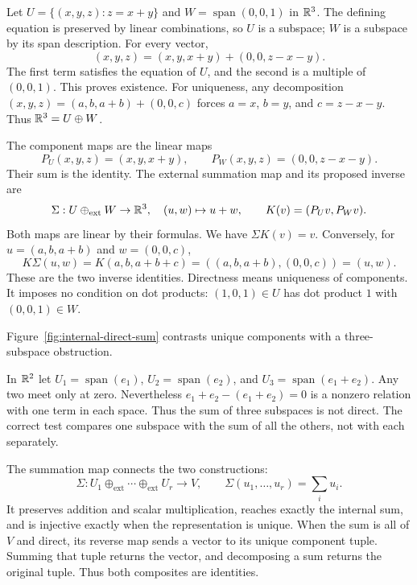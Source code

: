 \begin{example}\label{ex:positive-direct-sum}
Let $U=\{(x,y,z):z=x+y\}$ and $W=\operatorname{span}(0,0,1)$ in $\mathbb{R}^3$.
The defining equation is preserved by linear combinations, so $U$ is a
subspace; $W$ is a subspace by its span description. For every vector,
\[
(x,y,z)=(x,y,x+y)+(0,0,z-x-y).
\]
The first term satisfies the equation of $U$, and the second is a multiple
of $(0,0,1)$. This proves existence. For uniqueness, any decomposition
$(x,y,z)=(a,b,a+b)+(0,0,c)$ forces $a=x$, $b=y$, and $c=z-x-y$.
Thus $\mathbb{R}^3=U\oplus W$.

The component maps are the linear maps
\[
P_U(x,y,z)=(x,y,x+y),\qquad P_W(x,y,z)=(0,0,z-x-y).
\]
Their sum is the identity. The external summation map and its proposed inverse are
\[
\Sigma:U\oplus_{\mathrm{ext}}W\to\mathbb{R}^3,\quad (u,w)\mapsto u+w,
\qquad K(v)=(P_Uv,P_Wv).
\]
Both maps are linear by their formulas. We have $\Sigma K(v)=v$.
Conversely, for $u=(a,b,a+b)$ and $w=(0,0,c)$,
\[
K\Sigma(u,w)=K(a,b,a+b+c)=((a,b,a+b),(0,0,c))=(u,w).
\]
These are the two inverse identities. Directness means uniqueness of
components. It imposes no condition on dot products: $(1,0,1)\in U$ has
dot product $1$ with $(0,0,1)\in W$.
\end{example}
Figure~\ref{fig:internal-direct-sum} contrasts unique components with a
three-subspace obstruction.

\FloatBarrier
\begin{example}
In $\mathbb{R}^2$ let $U_1=\operatorname{span}(e_1)$,
$U_2=\operatorname{span}(e_2)$, and $U_3=\operatorname{span}(e_1+e_2)$.
Any two meet only at zero. Nevertheless
$e_1+e_2-(e_1+e_2)=0$ is a nonzero relation with one term in each space.
Thus the sum of three subspaces is not direct. The correct test compares
one subspace with the sum of all the others, not with each separately.
\end{example}
The summation map connects the two constructions:
\[
\Sigma:U_1\oplus_{\mathrm{ext}}\cdots\oplus_{\mathrm{ext}}U_r\to V,
\qquad \Sigma(u_1,\ldots,u_r)=\sum_i u_i.
\]
It preserves addition and scalar multiplication, reaches exactly the
internal sum, and is injective exactly when the representation is unique.
When the sum is all of $V$ and direct, its reverse map sends a vector to
its unique component tuple. Summing that tuple returns the vector, and
decomposing a sum returns the original tuple. Thus both composites are identities.

